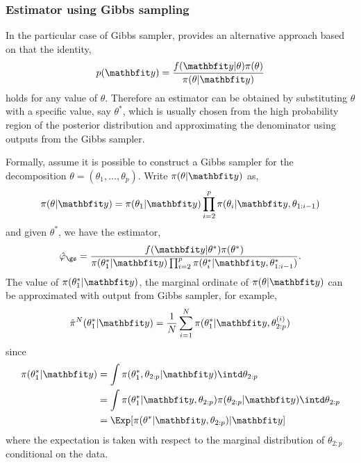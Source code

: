 \subsubsection{Estimator using Gibbs sampling}
\label{ssub:Estimator using Gibbs sampling}

In the particular case of Gibbs sampler, \cite{Chib:1995em} provides an
alternative approach based on that the identity,
\begin{equation}
  p(\data) = \frac{f(\data|\theta)\pi(\theta)}{\pi(\theta|\data)}
\end{equation}
holds for any value of $\theta$. Therefore an estimator can be obtained by
substituting $\theta$ with a specific value, say $\theta^*$, which is usually
chosen from the high probability region of the posterior distribution and
approximating the denominator using outputs from the Gibbs sampler.

Formally, assume it is possible to construct a Gibbs sampler for the
decomposition $\theta = (\theta_1,\dots,\theta_p)$. Write $\pi(\theta|\data)$
as,
\begin{equation}
  \pi(\theta|\data) = \pi(\theta_1|\data)
  \prod_{i=2}^p\pi(\theta_i|\data,\theta_{1:i-1})
\end{equation}
and given $\theta^*$, we have the estimator,
\begin{equation}
  \hat\varphi_{\gs} = \frac{f(\data|\theta^*)\pi(\theta^*)}
  {\pi(\theta_1^*|\data)
    \prod_{i=2}^p\pi(\theta_i^*|\data,\theta_{1:i-1}^*)}.
\end{equation}
The value of $\pi(\theta_1^*|\data)$, the marginal ordinate of
$\pi(\theta|\data)$ can be approximated with output from Gibbs sampler, for
example,
\begin{equation}
  \hat\pi^N(\theta_1^*|\data)
  = \frac{1}{N}\sum_{i=1}^N \pi(\theta_1^*|\data,\theta_{2:p}^{(i)})
  \label{eq:est gibbs first}
\end{equation}
since
\begin{align*}
  \pi(\theta_1^*|\data)
  &= \int\pi(\theta_1^*, \theta_{2:p}|\data)\intd\theta_{2:p} \\
  &= \int\pi(\theta_1^*|\data,\theta_{2:p})
  \pi(\theta_{2:p}|\data)\intd\theta_{2:p} \\
  &= \Exp[\pi(\theta^*|\data,\theta_{2:p})|\data]
\end{align*}
where the expectation is taken with respect to the marginal distribution of
$\theta_{2:p}$ conditional on the data.

